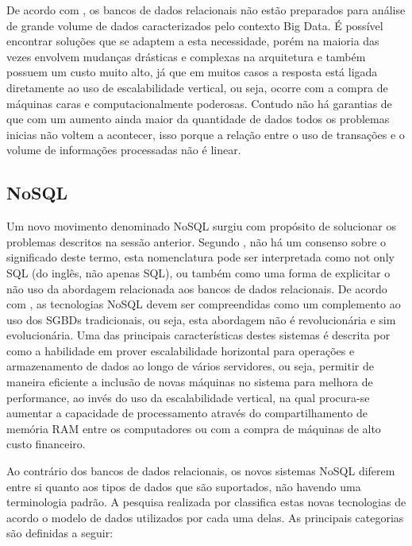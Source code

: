 De acordo com , os bancos de dados relacionais não estão preparados para análise de grande volume de dados caracterizados pelo contexto Big Data. É possível encontrar soluções que se adaptem a esta necessidade, porém na maioria das vezes envolvem mudanças drásticas e complexas na arquitetura e também possuem um custo muito alto, já que em muitos casos a resposta está ligada diretamente ao uso de escalabilidade vertical, ou seja, ocorre com a compra de máquinas caras e computacionalmente poderosas. Contudo não há garantias de que com um aumento ainda maior da quantidade de dados todos os problemas inicias não voltem a acontecer, isso porque a relação entre o uso de transações e o volume de informações processadas não é linear.

\subsection{NoSQL}

Um novo movimento denominado NoSQL surgiu com propósito de solucionar os problemas  descritos na sessão anterior. Segundo , não há um consenso sobre o significado deste termo, esta nomenclatura pode ser interpretada como not only SQL (do inglês, não apenas SQL), ou também como uma forma de explicitar o não uso da abordagem relacionada aos bancos de dados relacionais. De acordo com , as tecnologias NoSQL devem ser compreendidas como um complemento ao uso dos SGBDs tradicionais, ou seja, esta abordagem não é revolucionária e sim evolucionária. Uma das principais características destes sistemas é descrita por  como a habilidade em prover escalabilidade horizontal para operações e armazenamento de dados ao longo de vários servidores, ou seja, permitir de maneira eficiente a inclusão de novas máquinas no sistema para melhora de performance, ao invés do uso da escalabilidade vertical, na qual procura-se aumentar a capacidade de processamento através do compartilhamento de memória RAM entre os computadores ou com a compra de máquinas de alto custo financeiro.

Ao contrário dos bancos de dados relacionais, os novos sistemas NoSQL diferem entre si quanto aos tipos de dados que são suportados, não havendo uma terminologia padrão. A pesquisa realizada por  classifica estas novas tecnologias de acordo o modelo de dados utilizados por cada uma delas. As principais categorias são definidas a seguir:


